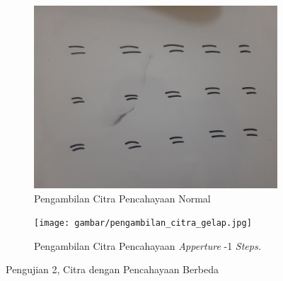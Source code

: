 \begin{figure}[H]
  \begin{subfigure}{.5\textwidth}
    \centering
    \captionsetup{width=.8\linewidth}
    \includegraphics[width=.85\linewidth]{gambar/pengambilan_citra_terang.jpg}
    \caption{Pengambilan Citra Pencahayaan Normal}
    \label{fig:2citracahaya0}
  \end{subfigure}%
  \begin{subfigure}{.5\textwidth}
    \centering
    \captionsetup{width=.8\linewidth}
    \texttt{[image: gambar/pengambilan\_citra\_gelap.jpg]}
    \caption{Pengambilan Citra Pencahayaan \textit{Apperture} -1 \textit{Steps.}}
    \label{fig:2citracahayamin10}
  \end{subfigure}
  \caption{Pengujian 2, Citra dengan Pencahayaan Berbeda}
  \label{fig:citracahayavariasi2}
\end{figure}

